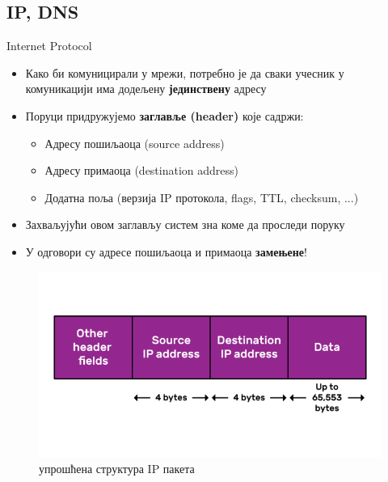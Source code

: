 \documentclass[aspectratio=169]{beamer}
\begin{document}
    \subsection[]{IP, DNS}

    \begin{frame}[allowframebreaks]{Internet Protocol}
        \begin{itemize}
            \item Како би комуницирали у мрежи, потребно је да сваки учесник у комуникацији има додељену \textbf{јединствену} адресу
            \item Поруци придружујемо \textbf{заглавље (header)} које садржи:
            \begin{itemize}
                \item Адресу пошиљаоца (source address)
                \item Адресу примаоца (destination address)
                \item Додатна поља (верзија IP протокола, flags, TTL, checksum, ...)
            \end{itemize}
            \item Захваљујући овом заглављу систем зна коме да проследи поруку
            \item У одговори су адресе пошиљаоца и примаоца \textbf{замењене}!
        \end{itemize}

        \framebreak

        \begin{figure}
            \centering
            \includegraphics[width=\textwidth,height=0.7\textheight,keepaspectratio]{images/ip.png}
            \caption{упрошћена структура IP пакета}
            \label{fig:ip}
        \end{figure}
    \end{frame}
\end{document}

